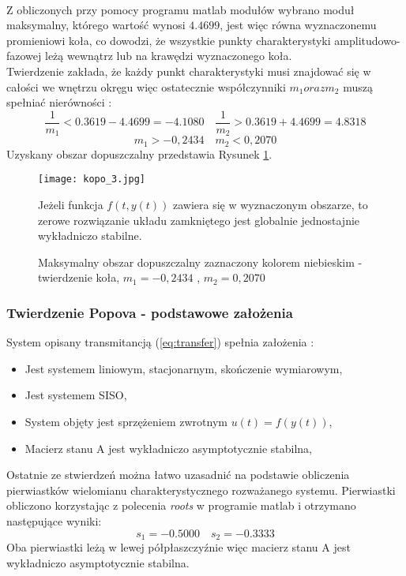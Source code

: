 \documentclass[a4paper,11pt]{article}
\begin{document}
\\ Z obliczonych przy pomocy programu matlab modułów wybrano moduł maksymalny, którego wartość wynosi \( 4.4699 \), jest więc równa wyznaczonemu promieniowi koła, co dowodzi, że wszystkie punkty charakterystyki amplitudowo-fazowej leżą wewnątrz lub na krawędzi wyznaczonego koła. \\ 
Twierdzenie zakłada, że każdy punkt charakterystyki musi znajdować się w całości we wnętrzu okręgu więc ostatecznie współczynniki \( m_{1} oraz m_{2} \) muszą spełniać nierówności : 
\begin{equation*}
\frac{1}{m_{1}} < 0.3619 - 4.4699 = -4.1080 \quad
\frac{1}{m_{2}} > 0.3619 + 4.4699 = 4.8318  
\end{equation*}
\begin{equation*}
m_{1}>-0,2434 \quad m_{2}<0,2070  
\end{equation*}
Uzyskany obszar dopuszczalny przedstawia Rysunek \ref{fig:kopo_3}.
\begin{figure}[H]
\centerline{\texttt{[image: kopo\_3.jpg]}}
\caption{Maksymalny obszar dopuszczalny zaznaczony kolorem niebieskim - twierdzenie koła, \(m_{1}=-0,2434\) , \(m_{2}=0,2070\) }
\vspace{10pt}
Jeżeli funkcja \( f(t,y(t)) \) zawiera się w wyznaczonym obszarze, to zerowe rozwiązanie układu zamkniętego jest globalnie jednostajnie wykładniczo stabilne. 
\label{fig:kopo_3}
\end{figure}
\subsubsection{Twierdzenie Popova - podstawowe założenia}
System opisany transmitancją (\ref{eq:transfer}) spełnia założenia :
\begin{itemize}
\item Jest systemem liniowym, stacjonarnym, skończenie wymiarowym,
\item Jest systemem SISO,
\item System objęty jest sprzężeniem zwrotnym \( u(t)=f(y(t)) \), 
\item Macierz stanu A jest wykładniczo asymptotycznie stabilna,
\end{itemize}
Ostatnie ze stwierdzeń można łatwo uzasadnić na podstawie obliczenia pierwiastków wielomianu charakterystycznego rozważanego systemu. Pierwiastki obliczono korzystając z polecenia \textit{roots} w programie matlab i otrzymano następujące wyniki:
\begin{equation*}
s_{1} = -0.5000
\quad s_{2} = -0.3333
\end{equation*}
Oba pierwiastki leżą w lewej półpłaszczyźnie więc macierz stanu A jest wykładniczo asymptotycznie stabilna.
\end{document}
